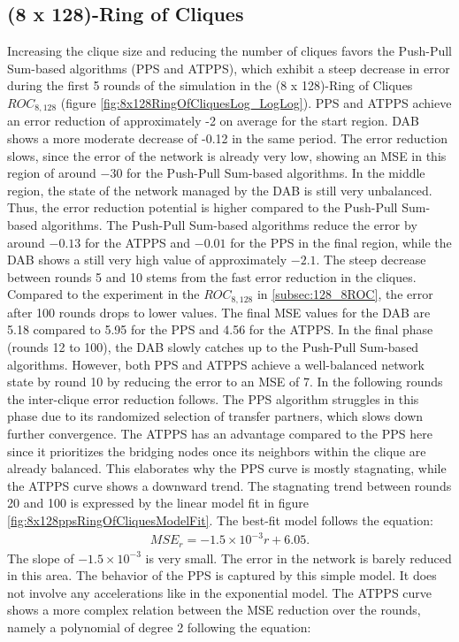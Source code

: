 \subsection{(8 x 128)-Ring of Cliques}\label{subsec:8_128ROC}
Increasing the clique size and reducing the number of cliques favors the Push-Pull Sum-based algorithms (PPS and ATPPS), which exhibit a steep decrease in error during the first 5 rounds of the simulation in the (8 x 128)-Ring of Cliques $ROC_{8,128}$ (figure \ref{fig:8x128RingOfCliquesLog_LogLog}). PPS and ATPPS achieve an error reduction of approximately -2 on average for the start region. DAB shows a more moderate decrease of -0.12 in the same period. The error reduction slows, since the error of the network is already very low, showing an MSE in this region of around $-30$ for the Push-Pull Sum-based algorithms. In the middle region, the state of the network managed by the DAB is still very unbalanced. Thus, the error reduction potential is higher compared to the Push-Pull Sum-based algorithms. The Push-Pull Sum-based algorithms reduce the error by around $-0.13$ for the ATPPS and $-0.01$ for the PPS in the final region, while the DAB shows a still very high value of approximately $-2.1$. The steep decrease between rounds 5 and 10 stems from the fast error reduction in the cliques. Compared to the experiment in the $ROC_{8, 128}$ in \ref{subsec:128_8ROC}, the error after 100 rounds drops to lower values. The final MSE values for the DAB are 5.18 compared to 5.95 for the PPS and 4.56 for the ATPPS. In the final phase (rounds 12 to 100), the DAB slowly catches up to the Push-Pull Sum-based algorithms. However, both PPS and ATPPS achieve a well-balanced network state by round 10 by reducing the error to an MSE of 7. In the following rounds the inter-clique error reduction follows. The PPS algorithm struggles in this phase due to its randomized selection of transfer partners, which slows down further convergence. The ATPPS has an advantage compared to the PPS here since it prioritizes the bridging nodes once its neighbors within the clique are already balanced. This elaborates why the PPS curve is mostly stagnating, while the ATPPS curve shows a downward trend. The stagnating trend between rounds 20 and 100 is expressed by the linear model fit in figure \ref{fig:8x128ppsRingOfCliquesModelFit}. The best-fit model follows the equation:
\begin{align}
    MSE_r=-1.5\times10^{-3}r+6.05. 
\end{align}
The slope of $-1.5\times10^{-3}$ is very small. The error in the network is barely reduced in this area. The behavior of the PPS is captured by this simple model. It does not involve any accelerations like in the exponential model. The ATPPS curve shows a more complex relation between the MSE reduction over the rounds, namely a polynomial of degree 2 following the equation:
